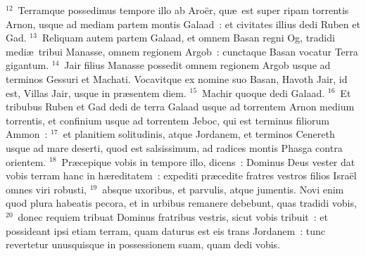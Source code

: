 ${}^{12}$~Terramque possedimus tempore illo ab Aro\"er, qu\ae\ est super ripam torrentis Arnon, usque ad mediam partem montis Galaad~: et civitates illius dedi Ruben et Gad.
${}^{13}$~Reliquam autem partem Galaad, et omnem Basan regni Og, tradidi medi\ae\ tribui Manasse, omnem regionem Argob~: cunctaque Basan vocatur Terra gigantum.
${}^{14}$~Jair filius Manasse possedit omnem regionem Argob usque ad terminos Gessuri et Machati. Vocavitque ex nomine suo Basan, Havoth Jair, id est, Villas Jair, usque in pr\ae sentem diem.
${}^{15}$~Machir quoque dedi Galaad.
${}^{16}$~Et tribubus Ruben et Gad dedi de terra Galaad usque ad torrentem Arnon medium torrentis, et confinium usque ad torrentem Jeboc, qui est terminus filiorum Ammon~:
${}^{17}$~et planitiem solitudinis, atque Jordanem, et terminos Cenereth usque ad mare deserti, quod est salsissimum, ad radices montis Phasga contra orientem.
${}^{18}$~Pr\ae cepique vobis in tempore illo, dicens~: Dominus Deus vester dat vobis terram hanc in h\ae reditatem~: expediti pr\ae cedite fratres vestros filios Isra\"el omnes viri robusti,
${}^{19}$~absque uxoribus, et parvulis, atque jumentis. Novi enim quod plura habeatis pecora, et in urbibus remanere debebunt, quas tradidi vobis,
${}^{20}$~donec requiem tribuat Dominus fratribus vestris, sicut vobis tribuit~: et possideant ipsi etiam terram, quam daturus est eis trans Jordanem~: tunc revertetur unusquisque in possessionem suam, quam dedi vobis.


